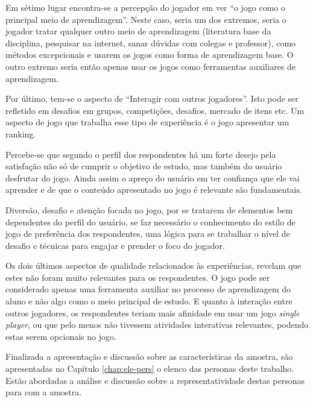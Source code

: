 Em sétimo lugar encontra-se a percepção do jogador em ver ``o jogo como o principal meio de aprendizagem''. Neste caso, seria um dos extremos, seria o jogador tratar qualquer outro meio de aprendizagem (literatura base da disciplina, pesquisar na internet, sanar dúvidas com colegas e professor), como métodos excepcionais e usarem os jogos como forma de aprendizagem base. O outro extremo seria então apenas usar os jogos como ferramentas auxiliares de aprendizagem.

Por último, tem-se  o aspecto de ``Interagir com outros jogadores''. Isto pode ser refletido em desafios em grupos, competições, desafios, mercado de itens etc. Um aspecto de jogo que trabalha esse tipo de experiência é o jogo apresentar um ranking.

Percebe-se que segundo o perfil dos respondentes há um forte desejo pela satisfação não só de cumprir o objetivo de estudo, mas também do usuário desfrutar do jogo. Ainda assim o apreço do usuário em ter confiança que ele vai aprender e de que o conteúdo apresentado no jogo é relevante são fundamentais.

Diversão, desafio e atenção focada no jogo, por se tratarem de elementos bem dependentes do perfil do usuário, se faz necessário o conhecimento do estilo de jogo de preferência dos respondentes, uma lógica para se trabalhar o nível de desafio e técnicas para engajar e prender o foco do jogador.

Os dois últimos aspectos de qualidade relacionados às experiências, revelam que estes não foram muito relevantes para os respondentes. O jogo pode ser considerado apenas uma ferramenta auxiliar no processo de aprendizagem do aluno e não algo como o meio principal de estudo. E quanto à interação entre outros jogadores, os respondentes teriam mais afinidade em usar um jogo \textit{single player}, ou que pelo menos não tivessem atividades interativas relevantes, podendo estas serem opcionais no jogo.

Finalizada a apresentação e discussão sobre as características da amostra, são apresentadas no Capítulo \ref{chap:ele-pers} o elenco das personas deste trabalho. Estão abordadas a análise e discussão sobre a representatividade destas personas para com a amostra.





